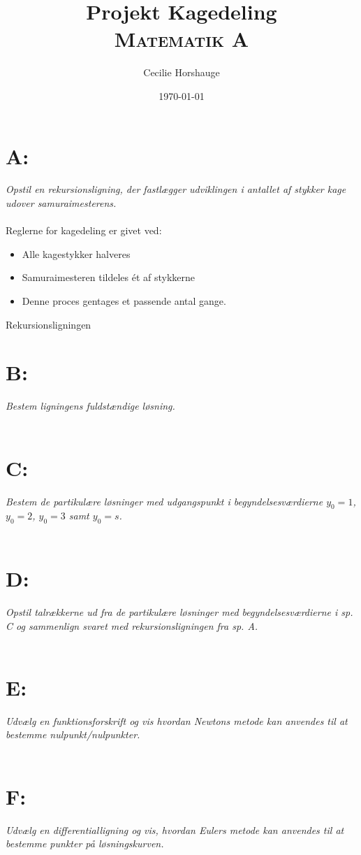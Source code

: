 \documentclass[a4paper, 11pt]{article}
\title{Projekt Kagedeling\\{\large \textsc{Matematik A}}}
\author{Cecilie Horshauge}
\date{\today}
\begin{document}
\maketitle

\section*{A:}
\textit{Opstil en rekursionsligning, der fastlægger udviklingen i antallet af stykker kage udover samuraimesterens.}\\\\
Reglerne for kagedeling er givet ved:
\begin{itemize}
    \item Alle kagestykker halveres
    \item Samuraimesteren tildeles ét af stykkerne
    \item Denne proces gentages et passende antal gange.
\end{itemize}
Rekursionsligningen \(\)

\section*{B:}
\textit{Bestem ligningens fuldstændige løsning.}\\\\

\section*{C:}
\textit{Bestem de partikulære løsninger med udgangspunkt i begyndelsesværdierne \(y_0=1\), \(y_0=2\), \(y_0=3\) samt \(y_0=s\).}\\\\

\section*{D:}
\textit{Opstil talrækkerne ud fra de partikulære løsninger med begyndelsesværdierne i sp. C og sammenlign svaret med rekursionsligningen fra sp. A.}\\\\

\section*{E:}
\textit{Udvælg en funktionsforskrift og vis hvordan Newtons metode kan anvendes til at bestemme nulpunkt/nulpunkter.}\\\\

\section*{F:}
\textit{Udvælg en differentialligning og vis, hvordan Eulers metode kan anvendes til at bestemme punkter på løsningskurven.}\\\\
\end{document}
